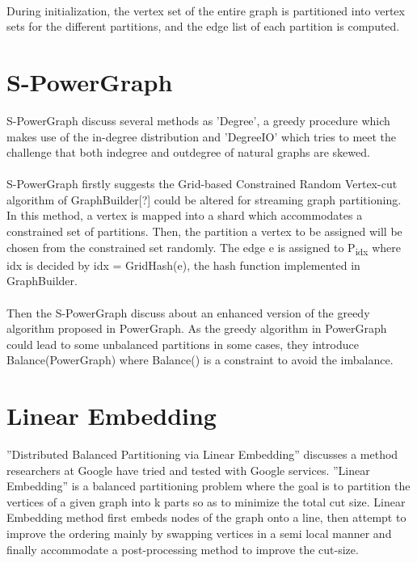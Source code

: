 \paragraph{}

During initialization, the vertex set of the entire graph is partitioned into vertex sets for the different partitions, and the edge list of each partition is computed. 

\section{S-PowerGraph}
S-PowerGraph\cite{S-PowerGraph} discuss several methods as ’Degree’, a greedy procedure which makes use of the in-degree distribution and ’DegreeIO’ which tries to meet the challenge that both indegree and outdegree of natural graphs are skewed. 

\paragraph{}

S-PowerGraph firstly suggests the Grid-based Constrained Random Vertex-cut algorithm of GraphBuilder[?] could be altered for streaming graph partitioning. In this method, a vertex is mapped into a shard which accommodates a constrained set of partitions. Then, the partition a vertex to be assigned will be chosen from the constrained set randomly. The edge e is assigned to P\textsubscript{idx} where idx is decided by idx = GridHash(e), the hash function implemented in GraphBuilder. 

\paragraph{}

Then the S-PowerGraph discuss about an enhanced version of the greedy algorithm proposed in PowerGraph\cite{PowerGraph}. As the greedy algorithm in PowerGraph could lead to some unbalanced partitions in some cases, they introduce Balance(PowerGraph) where Balance() is a constraint to avoid the imbalance.

\paragraph{}

\section{Linear Embedding}
”Distributed Balanced Partitioning via Linear Embedding”\cite{Linear Embedding} discusses a method researchers at Google have tried and tested with Google services. ”Linear Embedding” is a balanced partitioning problem where the goal is to partition the vertices of a given graph into k parts so as to minimize the total cut size. Linear Embedding method first embeds nodes of the graph onto a line, then attempt to improve the ordering mainly by swapping vertices in a semi local manner and finally accommodate a post-processing method to improve the cut-size.

